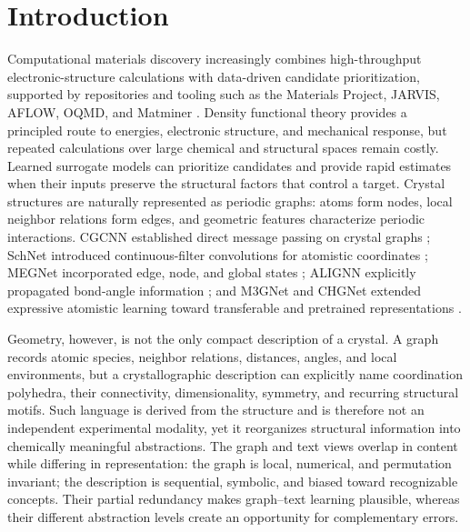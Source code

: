 \documentclass[a4paper,fleqn]{cas-sc}
\begin{document}
\section{Introduction}
Computational materials discovery increasingly combines high-throughput electronic-structure calculations with data-driven candidate prioritization, supported by repositories and tooling such as the Materials Project, JARVIS, AFLOW, OQMD, and Matminer \citep{jain2013materialsproject,choudhary2020jarvis,curtarolo2012aflow,saal2013oqmd,ward2018matminer}. Density functional theory provides a principled route to energies, electronic structure, and mechanical response, but repeated calculations over large chemical and structural spaces remain costly. Learned surrogate models can prioritize candidates and provide rapid estimates when their inputs preserve the structural factors that control a target. Crystal structures are naturally represented as periodic graphs: atoms form nodes, local neighbor relations form edges, and geometric features characterize periodic interactions. CGCNN established direct message passing on crystal graphs \citep{xie2018cgcnn}; SchNet introduced continuous-filter convolutions for atomistic coordinates \citep{schutt2018schnet}; MEGNet incorporated edge, node, and global states \citep{chen2019megnet}; ALIGNN explicitly propagated bond-angle information \citep{choudhary2021alignn}; and M3GNet and CHGNet extended expressive atomistic learning toward transferable and pretrained representations \citep{chen2022m3gnet,deng2023chgnet}.

Geometry, however, is not the only compact description of a crystal. A graph records atomic species, neighbor relations, distances, angles, and local environments, but a crystallographic description can explicitly name coordination polyhedra, their connectivity, dimensionality, symmetry, and recurring structural motifs. Such language is derived from the structure and is therefore not an independent experimental modality, yet it reorganizes structural information into chemically meaningful abstractions. The graph and text views overlap in content while differing in representation: the graph is local, numerical, and permutation invariant; the description is sequential, symbolic, and biased toward recognizable concepts. Their partial redundancy makes graph--text learning plausible, whereas their different abstraction levels create an opportunity for complementary errors.
\end{document}
